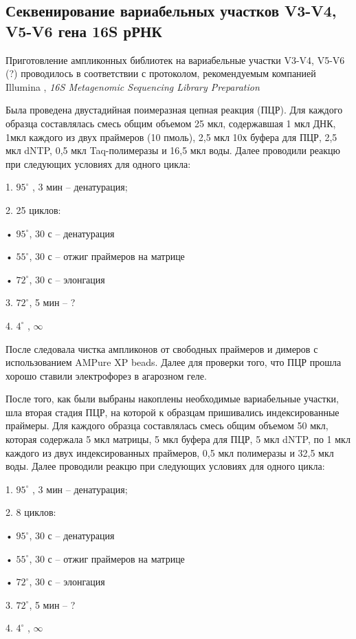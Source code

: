 \subsection{Секвенирование вариабельных участков V3-V4, V5-V6 гена 16S рРНК}  \label{subsect1_2_2}

Приготовление ампликонных библиотек на вариабельные участки V3-V4, V5-V6 (?) проводилось  в соответствии с протоколом, рекомендуемым компанией Illumina , \textit{16S Metagenomic Sequencing Library Preparation }

Была проведена  двустадийная поимеразная цепная реакция (ПЦР). Для каждого образца составлялась смесь общим объемом 25 мкл, содержавшая 1 мкл ДНК, 1мкл каждого из двух праймеров (10 пмоль), 2,5 мкл 10х буфера для ПЦР, 2,5 мкл dNTP, 0,5 мкл  Taq-полимеразы и 16,5 мкл воды. Далее проводили реакцю при следующих условиях для одного цикла:

1.	$95^{\circ}$ , 3 мин – денатурация;

2.	25 циклов:

•	$95^{\circ}$, 30 с – денатурация

•	$55^{\circ}$, 30 с – отжиг праймеров на матрице

•	$72^{\circ}$, 30 с – элонгация

3.	$72^{\circ}$, 5 мин – ?

4.  $4^{\circ}$ ,  $\infty$

После следовала чистка ампликонов от свободных праймеров и димеров с использованием AMPure XP beads. Далее для проверки того, что ПЦР прошла хорошо ставили электрофорез в агарозном геле. 

После того, как были выбраны накоплены необходимые вариабельные участки, шла вторая стадия ПЦР, на которой к образцам пришивались индексированные праймеры.  Для каждого образца составлялась смесь общим объемом 50 мкл, которая содержала 5 мкл матрицы, 5 мкл буфера для ПЦР, 5 мкл dNTP, по 1 мкл каждого из двух индексированных праймеров, 0,5 мкл полимеразы и 32,5 мкл воды. Далее проводили реакцю при следующих условиях для одного цикла:

1.	$95^{\circ}$ , 3 мин – денатурация;

2.	8 циклов:

•	$95^{\circ}$, 30 с – денатурация

•	$55^{\circ}$, 30 с – отжиг праймеров на матрице

•	$72^{\circ}$, 30 с – элонгация

3.	$72^{\circ}$, 5 мин – ?

4.  $4^{\circ}$ ,  $\infty$

